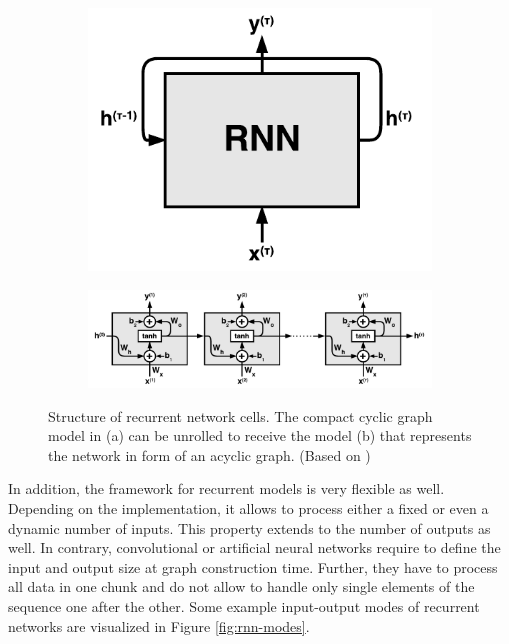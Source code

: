 \begin{figure}[htpb]
\centering
\begin{subfigure}{0.26\textwidth}
  \centering
  \includegraphics[scale=0.5]{figures/rnn_loop.pdf}
  \caption{}
  \label{fig:rnn-loop}
\end{subfigure}%
\begin{subfigure}{0.74\textwidth}
  \centering
  \includegraphics[scale=0.5]{figures/rnn_unrolled.pdf}
  \caption{}
  \label{fig:rnn-unrolled}
\end{subfigure}
\caption[Structure of Recurrent Cells]{Structure of recurrent network cells. The compact cyclic graph model in (a) can be unrolled to receive the model (b) that represents the network in form of an acyclic graph. (Based on \parencite{understand_lstm})}
\label{fig:rnn}
\end{figure}

In addition, the framework for recurrent models is very flexible as well. Depending on the implementation, it allows to process either a fixed or even a dynamic number of inputs. This property extends to the number of outputs as well. In contrary, convolutional or artificial neural networks require to define the input and output size at graph construction time. Further, they have to process all data in one chunk and do not allow to handle only single elements of the sequence one after the other. Some example input-output modes of recurrent networks are visualized in Figure \ref{fig:rnn-modes}.

